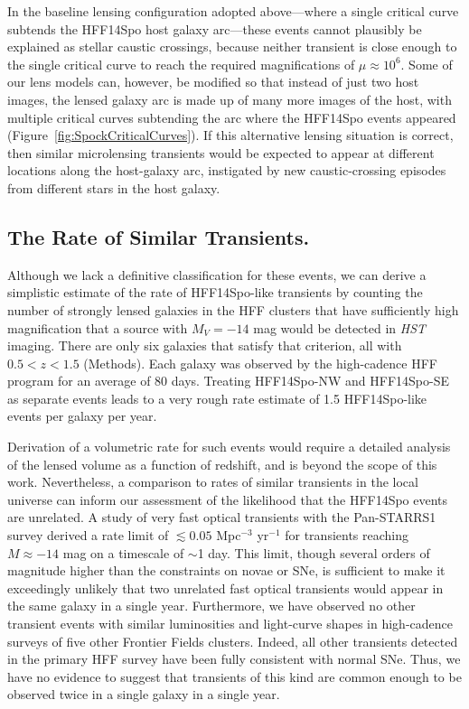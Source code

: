 \documentclass{article}
\providecommand\citet{\cite}
\def\HST{{\it HST}\xspace}
\def\spock{HFF14Spo\xspace}
\def\spockone{HFF14Spo-NW\xspace}
\def\spocktwo{HFF14Spo-SE\xspace}
\begin{document}
In the baseline lensing configuration adopted above---where a single
critical curve subtends the \spock host galaxy arc---these events
cannot plausibly be explained as stellar caustic crossings, because
neither transient is close enough to the single critical curve to
reach the required magnifications of $\mu\approx10^6$.  Some of our lens
models can, however, be modified so that instead of just two host
images, the lensed galaxy arc is made up of many more images of the
host, with multiple critical curves subtending the arc where the
\spock events appeared (Figure~\ref{fig:SpockCriticalCurves}).
If this alternative lensing
situation is correct, then similar microlensing transients would be
expected to appear at different locations along the host-galaxy arc,
instigated by new caustic-crossing episodes from different stars in
the host galaxy.

\subsection{The Rate of Similar Transients.}\label{sec:Rates}

Although we lack a definitive classification for these events, we can
derive a simplistic estimate of the rate of \spock-like transients by
counting the number of strongly lensed galaxies in the HFF clusters
that have sufficiently high magnification that a source with
$M_{V}=-14$ mag would be detected in \HST imaging. There are only six
galaxies that satisfy that criterion, all with $0.5<z<1.5$
(Methods).  Each galaxy was observed by the high-cadence HFF program
for an average of 80 days.  Treating \spockone and \spocktwo as
separate events leads to a very rough rate estimate of 1.5 \spock-like
events per galaxy per year.

Derivation of a volumetric rate for such events would require a
detailed analysis of the lensed volume as a function of redshift, and
is beyond the scope of this work. Nevertheless, a comparison to rates
of similar transients in the local universe can inform our assessment
of the likelihood that the \spock events are unrelated.  A study of
very fast optical transients with the Pan-STARRS1 survey derived a
rate limit of $\lesssim0.05$ Mpc$^{-3}$ yr$^{-1}$ for transients
reaching $M\approx -14$ mag on a timescale of $\sim$1
day\citet{Berger:2013b}.  This limit, though several orders of
magnitude higher than the constraints on novae or SNe, is sufficient
to make it exceedingly unlikely that two unrelated fast optical
transients would appear in the same galaxy in a single year.
Furthermore, we have observed no other transient events with similar
luminosities and light-curve shapes in high-cadence surveys of five
other Frontier Fields clusters. Indeed, all other transients detected
in the primary HFF survey have been fully consistent with normal SNe.
Thus, we have no evidence to suggest that transients of this kind are
common enough to be observed twice in a single galaxy in a single
year.
\end{document}
